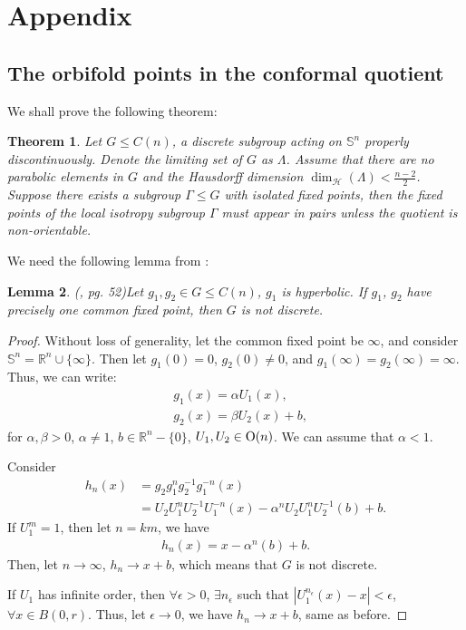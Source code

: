 \documentclass[12pt]{amsart}
\newtheorem{theorem}{Theorem}[section]
\newtheorem{lemma}[theorem]{Lemma}
\theoremstyle{definition}
\begin{document}
\section{Appendix}
\subsection{The orbifold points in the conformal quotient}\label{orbifold points in the quotient}
We shall prove the following theorem:

\begin{theorem}\label{number ends}
    Let $G\leq C(n)$, a discrete subgroup acting on $\mathbb{S}^n$ properly discontinuously. Denote the limiting set of $G$ as $\Lambda$. Assume that there are no parabolic elements in $G$ and the Hausdorff dimension $\operatorname{dim}_{\mathcal{H}}(\Lambda) < \frac{n-2}{2}$. Suppose there exists a subgroup $\Gamma\leq G$ with isolated fixed points, then the fixed points of the local isotropy subgroup $\Gamma$ must appear in pairs unless the quotient is non-orientable.
\end{theorem}

We need the following lemma from \cite{discrete_group}:
\begin{lemma}(\cite{discrete_group}, pg. 52)\label{hyperbolic fixed point}
  Let $g_1,g_2\in G\leq C(n)$, $g_1$ is hyperbolic. If $g_1$, $g_2$ have precisely one common fixed point, then $G$ is not discrete.
\end{lemma}
\begin{proof}
  Without loss of generality, let the common fixed point be $\infty$, and consider $\mathbb{S}^n=\mathbb{R}^n\cup\{\infty\}$. Then let $g_1(0)=0$, $g_2(0)\neq 0$, and $g_1(\infty)=g_2(\infty)=\infty$. Thus, we can write:
  \begin{align*}
      &g_1(x)=\alpha U_1(x),\\
      &g_2(x)=\beta U_2(x)+b,
  \end{align*}
  for $\alpha,\beta>0$, $\alpha\neq 1$, $b\in\mathbb{R}^n-\{0\}$, $U_1,U_2\in {\rm{O}}(n)$. We can assume that $\alpha<1$. 
  
  Consider 
  \begin{align*}
      h_n(x)&=g_2 g_1^n g_2^{-1}g_1^{-n}(x)\\
      &=U_2U_1^{n}U_2^{-1}U_1^{-n}(x)-\alpha^n U_2 U_1^n U_2^{-1}(b)+b.
  \end{align*}
  If $U_1^m=1$, then let $n=km$, we have
  \begin{align*}
      h_n(x)=x-\alpha^n(b)+b.
  \end{align*}
  Then, let $n\to \infty$, $h_n\to x+b$, which means that $G$ is not discrete.
  
  If $U_1$ has infinite order, then $\forall\epsilon>0$, $\exists n_\epsilon$ such that $|U_1^{n_\epsilon}(x)-x|<\epsilon$, $\forall x\in B(0,r)$. Thus, let $\epsilon\to 0$, we have $h_n\to x+b$, same as before.
\end{proof}
\end{document}
